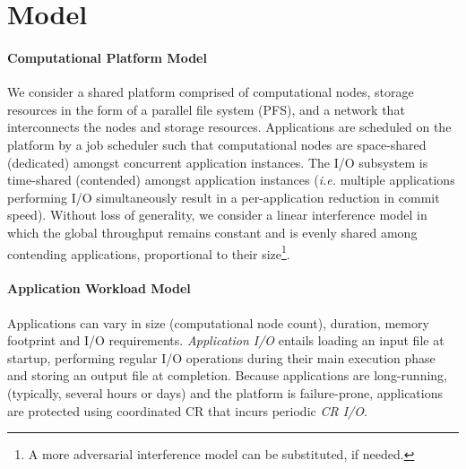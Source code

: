 \documentclass[conference,nofonttune]{IEEEtran}
\newcommand{\ie}[0]{\emph{i.e.}\xspace}
\begin{document}


%

\section{Model}
\label{sec:model}

\paragraph*{Computational Platform Model}

We consider a shared platform comprised of computational
nodes, storage resources in the form of a parallel file system (PFS), and a network
that interconnects the nodes and storage resources. Applications are
scheduled on the platform by a job scheduler such that computational nodes are
space-shared (dedicated) amongst concurrent application instances. The I/O
subsystem is time-shared (contended) amongst application instances  (\ie multiple
applications performing I/O simultaneously result in a per-application reduction
in commit speed). Without loss of generality, we consider a linear
interference model in which the global throughput remains constant and is evenly
shared among contending applications, proportional to their size\footnote{A more
adversarial interference model can be substituted, if needed.}.

\paragraph*{Application Workload Model}

Applications can vary in size (computational node count), duration, memory
footprint and I/O requirements.  \emph{Application I/O} entails loading an input file
at startup, performing regular I/O operations during their main execution phase and
storing an output file at completion. Because applications are long-running,
(typically, several hours or days) and the platform is failure-prone, applications
are protected using coordinated CR that incurs periodic \emph{CR I/O}.
\end{document}
